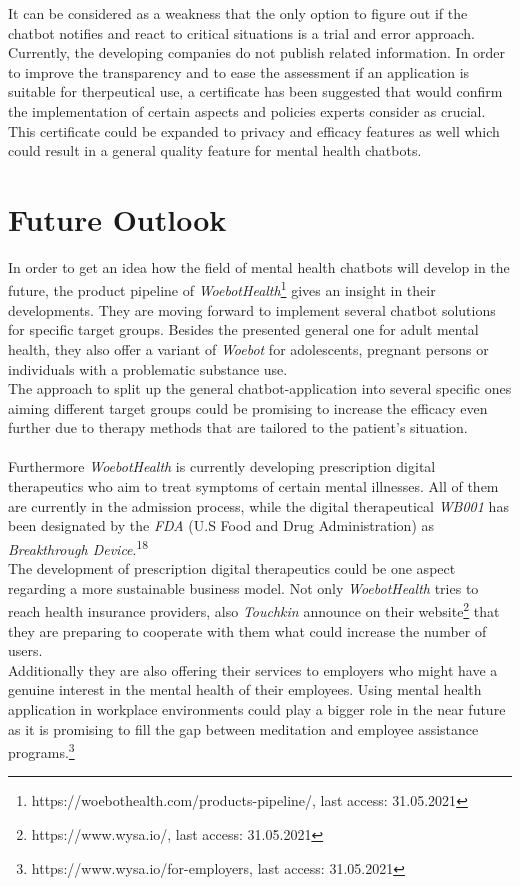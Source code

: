 \documentclass[sigconf, nonacm]{acmart}
\begin{document}
It can be considered as a weakness that the only option to figure out if the chatbot notifies and react to critical situations is a trial and error approach. Currently, the developing companies do not publish related information. In order to improve the transparency and to ease the assessment if an application is suitable for therpeutical use, a certificate has been suggested that would confirm the implementation of certain aspects and policies experts consider as crucial.
This certificate could be expanded to privacy and efficacy features as well which could result in a general quality feature for mental health chatbots.

\section{Future Outlook}
In order to get an idea how the field of mental health chatbots will develop in the future, the product pipeline of \emph{WoebotHealth}\footnote{https://woebothealth.com/products-pipeline/, last access: 31.05.2021} gives an insight in their developments. They are moving forward to implement several chatbot solutions for specific target groups. Besides the presented general one for adult mental health, they also offer a variant of \emph{Woebot} for adolescents, pregnant persons or 
individuals with a problematic substance use.
\\
The approach to split up the general chatbot-application into several specific ones aiming different target groups could be promising to increase the efficacy even further due to therapy methods that are tailored to the patient's situation. 
\\\\
Furthermore \emph{WoebotHealth} is currently developing prescription digital therapeutics who aim to treat symptoms of certain mental illnesses. All of them are currently in the admission process, while the digital therapeutical \emph{WB001} has been designated by the \emph{FDA} (U.S Food and Drug Administration) as \emph{Breakthrough Device}.\textsuperscript{18}
\\
The development of prescription digital therapeutics could be one aspect regarding a more sustainable business model. Not only \emph{WoebotHealth} tries to reach health insurance providers, also \emph{Touchkin} announce on their website\footnote{https://www.wysa.io/, last access: 31.05.2021} that they are preparing to cooperate with them what could increase the number of users.
\\
Additionally they are also offering their services to employers who might have a genuine interest in the mental health of their employees. Using mental health application in workplace environments could play a bigger role in the near future as it is promising to fill the gap between meditation and employee assistance programs.\footnote{https://www.wysa.io/for-employers, last access: 31.05.2021}
\end{document}
